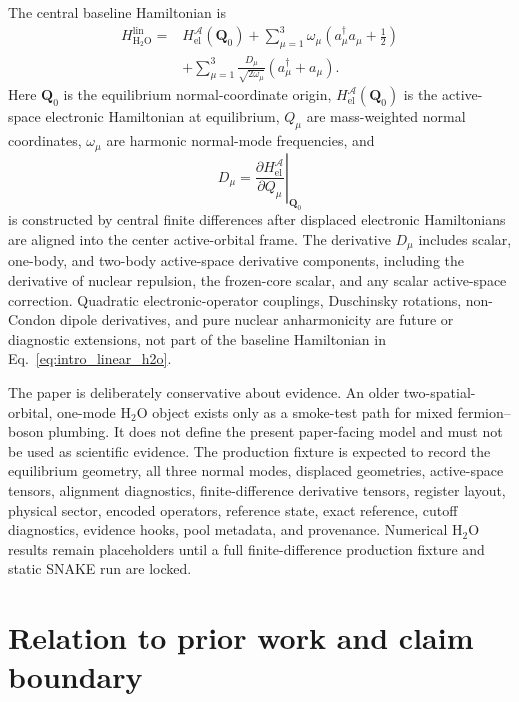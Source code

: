 \documentclass[
  reprint,
  amsmath,
  amssymb,
  aps,
  pra,
  nofootinbib,
  superscriptaddress,
  floatfix
]{revtex4-2}
\newcommand{\Acal}{\mathcal{A}}
\newcommand{\el}{\mathrm{el}}
\newcommand{\HtwoO}{\mathrm{H_2O}}
\newcommand{\lin}{\mathrm{lin}}
\begin{document}
The central baseline Hamiltonian is
\begin{align}
H_{\HtwoO}^{\lin}
={}&
H_{\el}^{\Acal}(\mathbf Q_0)
+
\sum_{\mu=1}^{3}
\omega_\mu
\left(a_\mu^\dagger a_\mu+\frac12\right)
\nonumber\\
&+
\sum_{\mu=1}^{3}
\frac{D_\mu}{\sqrt{2\omega_\mu}}
\left(a_\mu^\dagger+a_\mu\right).
\label{eq:intro_linear_h2o}
\end{align}
Here \(\mathbf Q_0\) is the equilibrium normal-coordinate origin, \(H_{\el}^{\Acal}(\mathbf Q_0)\) is the active-space electronic Hamiltonian at equilibrium, \(Q_\mu\) are mass-weighted normal coordinates, \(\omega_\mu\) are harmonic normal-mode frequencies, and
\begin{equation}
D_\mu
=
\left.
\frac{\partial H_{\el}^{\Acal}}{\partial Q_\mu}
\right|_{\mathbf Q_0}
\label{eq:intro_dmu}
\end{equation}
is constructed by central finite differences after displaced electronic Hamiltonians are aligned into the center active-orbital frame.  The derivative \(D_\mu\) includes scalar, one-body, and two-body active-space derivative components, including the derivative of nuclear repulsion, the frozen-core scalar, and any scalar active-space correction.  Quadratic electronic-operator couplings, Duschinsky rotations, non-Condon dipole derivatives, and pure nuclear anharmonicity are future or diagnostic extensions, not part of the baseline Hamiltonian in Eq.~\eqref{eq:intro_linear_h2o}.

The paper is deliberately conservative about evidence.  An older two-spatial-orbital, one-mode \(\HtwoO\) object exists only as a smoke-test path for mixed fermion--boson plumbing.  It does not define the present paper-facing model and must not be used as scientific evidence.  The production fixture is expected to record the equilibrium geometry, all three normal modes, displaced geometries, active-space tensors, alignment diagnostics, finite-difference derivative tensors, register layout, physical sector, encoded operators, reference state, exact reference, cutoff diagnostics, evidence hooks, pool metadata, and provenance.  Numerical \(\HtwoO\) results remain placeholders until a full finite-difference production fixture and static SNAKE run are locked.

\section{Relation to prior work and claim boundary}
\label{sec:literature_boundary}
\end{document}
